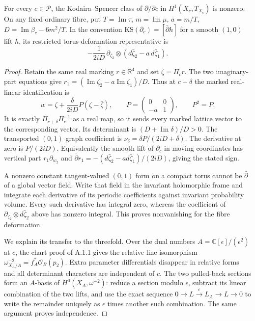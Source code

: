 \begin{proposition}\label{fam:src:A.4.2}\label{fam:st:A.4.2}
For every $c\in\mathcal P$, the Kodaira--Spencer class of $\partial/\partial c$ in $H^1(X_c,T_{X_c})$ is nonzero. On any fixed ordinary fibre, put $T=\operatorname{Im}\tau$, $m=\operatorname{Im}\mu$, $a=m/T$, $D=\operatorname{Im}\beta_c-6m^2/T$. In the convention $\mathrm{KS}(\partial_c)=[\bar\partial h]$ for a smooth $(1,0)$ lift $h$, its restricted torus-deformation representative is
\[
 -\frac{1}{2iD}\,\partial_{\zeta_2}\otimes
       (d\bar\zeta_2-a\,d\bar\zeta_1).
\]
\end{proposition}
\begin{proof}
Retain the same real marking $r\in\mathbb R^4$ and set $\zeta=\Pi_cr$. The two imaginary-part equations give
$r_1=(\operatorname{Im}\zeta_2-a\operatorname{Im}\zeta_1)/D$. Thus at $c+\delta$ the marked real-linear identification is
\[
 w=\zeta+\frac{\delta}{2iD}P(\zeta-\bar\zeta),\qquad
 P=\begin{pmatrix}0&0\\-a&1\end{pmatrix},\qquad P^2=P.
\]
It is exactly $\Pi_{c+\delta}\Pi_c^{-1}$ as a real map, so it sends every marked lattice vector to the corresponding vector. Its determinant is $(D+\operatorname{Im}\delta)/D>0$. The transported $(0,1)$ graph coefficient is $\nu_\delta=\delta P/(2iD+\delta)$. The derivative at zero is $P/(2iD)$. Equivalently the smooth lift of $\partial_c$ in moving coordinates has vertical part $r_1\partial_{w_2}$ and $\bar\partial r_1=-(d\bar\zeta_2-a d\bar\zeta_1)/(2iD)$, giving the stated sign.

A nonzero constant tangent-valued $(0,1)$ form on a compact torus cannot be $\bar\partial$ of a global vector field. Write that field in the invariant holomorphic frame and integrate each derivative of its periodic coefficients against invariant probability volume. Every such derivative has integral zero, whereas the coefficient of $\partial_{\zeta_2}\otimes d\bar\zeta_2$ above has nonzero integral. This proves nonvanishing for the fibre deformation.

We explain its transfer to the threefold. Over the dual numbers $A=\mathbb C[\epsilon]/(\epsilon^2)$ at $c$, the chart proof of A.1.1 gives the relative line isomorphism $\omega^{-2}_{X_A/A}=f_A^*\mathcal O_B(p_2)$. Extra parameter differentials disappear in relative forms and all determinant characters are independent of $c$. The two pulled-back sections form an $A$-basis of $H^0(X_A,\omega^{-2})$: reduce a section modulo $\epsilon$, subtract its linear combination of the two lifts, and use the exact sequence $0\to L\xrightarrow{\epsilon}L_A\to L\to0$ to write the remainder uniquely as $\epsilon$ times another such combination. The same argument proves independence.


\end{proof}
